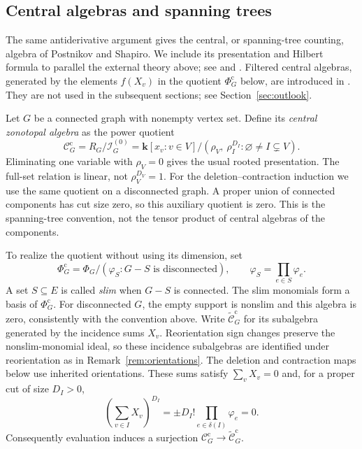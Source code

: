 \documentclass[reqno]{article}
\theoremstyle{plain} %
\theoremstyle{definition}
\theoremstyle{remark}
\newcommand{\K} {\mathbf{k}}
\newcommand {\CC}{\mathscr{C}}
\numberwithin{equation}{section}
\begin{document}
\subsection{Central algebras and spanning trees}
\label{sec:central}

The same antiderivative argument gives the central, or spanning-tree
counting, algebra of Postnikov and Shapiro. We include its presentation
and Hilbert formula to parallel the external theory above; see
\cite[Theorem~9.1 and Corollary~10.5]{PS} and
\cite[Section~4, Theorem~7]{NSh}. Filtered central algebras, generated
by the elements $f(X_v)$ in the quotient $\Phi_G^{\mathrm c}$ below, are
introduced in \cite[Section~4]{NSh}. They are not used in the subsequent
sections; see Section~\ref{sec:outlook}.

Let $G$ be a connected graph with nonempty vertex set. Define its
\emph{central zonotopal algebra} as the power quotient
\begin{equation}\label{eq:central-power-quotient}
\CC_G^{\mathrm c}=R_G/\mathcal I_G^{(0)}
=\K[x_v:v\in V]\big/
\left(\rho_V,\ \rho_I^{D_I}:\varnothing\ne I\subsetneq V\right).
\end{equation}
Eliminating one variable with $\rho_V=0$ gives the usual rooted
presentation. The full-set relation is linear, not $\rho_V^{D_V}=1$.
For the deletion--contraction induction we use the same quotient on a
disconnected graph. A proper union of connected components has cut size
zero, so this auxiliary quotient is zero. This is the spanning-tree
convention, not the tensor product of central algebras of the components.

To realize the quotient without using its dimension, set
\begin{equation}\label{eq:slim-edge-algebra}
\Phi_G^{\mathrm c}=
\Phi_G/(\varphi_S:G-S\text{ is disconnected}),\qquad
\varphi_S=\prod_{e\in S}\varphi_e.
\end{equation}
A set $S\subseteq E$ is called \emph{slim} when $G-S$ is connected.
The slim monomials form a basis of $\Phi_G^{\mathrm c}$.
For disconnected $G$, the empty support is nonslim and this algebra is
zero, consistently with the convention above. Write
$\widetilde{\CC}_G^{\mathrm c}$ for its subalgebra generated by the
incidence sums $X_v$.
Reorientation sign changes preserve the nonslim-monomial ideal, so
these incidence subalgebras are identified under reorientation as in
Remark~\ref{rem:orientations}. The deletion and contraction maps below
use inherited orientations. These sums satisfy $\sum_vX_v=0$ and,
for a proper cut of size $D_I>0$,
\[
\left(\sum_{v\in I}X_v\right)^{D_I}
=\pm D_I!\prod_{e\in\delta(I)}\varphi_e=0.
\]
Consequently evaluation induces a surjection
$\CC_G^{\mathrm c}\to\widetilde{\CC}_G^{\mathrm c}$.
\end{document}
